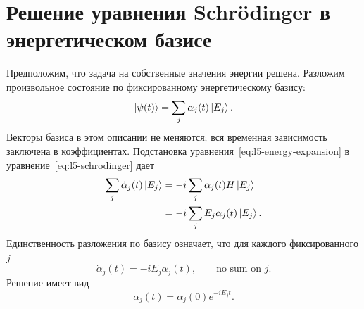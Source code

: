 \begin{classroomqa}
\end{classroomqa}

\begin{classroomqa}
\end{classroomqa}

\section{Решение уравнения Schr\"odinger в энергетическом базисе}

Предположим, что задача на собственные значения энергии решена. Разложим произвольное состояние по фиксированному энергетическому базису:
\begin{equation}
\left\lvert\psi(t)\right\rangle=\sum_j\alpha_j(t)\left\lvert E_j\right\rangle.
\label{eq:l5-energy-expansion}
\end{equation}
Векторы базиса в этом описании не меняются; вся временная зависимость заключена в коэффициентах. Подстановка уравнения~\eqref{eq:l5-energy-expansion} в уравнение~\eqref{eq:l5-schrodinger} дает
\begin{align}
\sum_j\dot\alpha_j(t)\left\lvert E_j\right\rangle
&=-i\sum_j\alpha_j(t)H\left\lvert E_j\right\rangle\\
&=-i\sum_j E_j\alpha_j(t)\left\lvert E_j\right\rangle.
\end{align}
Единственность разложения по базису означает, что для каждого фиксированного \(j\)
\begin{equation}
\dot\alpha_j(t)=-iE_j\alpha_j(t),
\qquad\text{no sum on \(j\)}.
\end{equation}
Решение имеет вид
\begin{equation}
\alpha_j(t)=\alpha_j(0)e^{-iE_jt}.
\label{eq:l5-energy-phase}
\end{equation}

